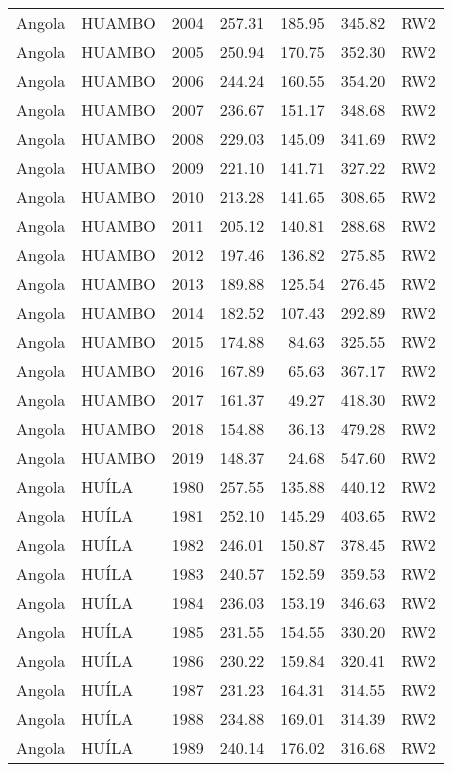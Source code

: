 \begin{longtable}{lllrrrl}
  Angola & HUAMBO & 2004 & 257.31 & 185.95 & 345.82 & RW2 \\ 
  Angola & HUAMBO & 2005 & 250.94 & 170.75 & 352.30 & RW2 \\ 
  Angola & HUAMBO & 2006 & 244.24 & 160.55 & 354.20 & RW2 \\ 
  Angola & HUAMBO & 2007 & 236.67 & 151.17 & 348.68 & RW2 \\ 
  Angola & HUAMBO & 2008 & 229.03 & 145.09 & 341.69 & RW2 \\ 
  Angola & HUAMBO & 2009 & 221.10 & 141.71 & 327.22 & RW2 \\ 
  Angola & HUAMBO & 2010 & 213.28 & 141.65 & 308.65 & RW2 \\ 
  Angola & HUAMBO & 2011 & 205.12 & 140.81 & 288.68 & RW2 \\ 
  Angola & HUAMBO & 2012 & 197.46 & 136.82 & 275.85 & RW2 \\ 
  Angola & HUAMBO & 2013 & 189.88 & 125.54 & 276.45 & RW2 \\ 
  Angola & HUAMBO & 2014 & 182.52 & 107.43 & 292.89 & RW2 \\ 
  Angola & HUAMBO & 2015 & 174.88 & 84.63 & 325.55 & RW2 \\ 
  Angola & HUAMBO & 2016 & 167.89 & 65.63 & 367.17 & RW2 \\ 
  Angola & HUAMBO & 2017 & 161.37 & 49.27 & 418.30 & RW2 \\ 
  Angola & HUAMBO & 2018 & 154.88 & 36.13 & 479.28 & RW2 \\ 
  Angola & HUAMBO & 2019 & 148.37 & 24.68 & 547.60 & RW2 \\ 
  Angola & HUÍLA & 1980 & 257.55 & 135.88 & 440.12 & RW2 \\ 
  Angola & HUÍLA & 1981 & 252.10 & 145.29 & 403.65 & RW2 \\ 
  Angola & HUÍLA & 1982 & 246.01 & 150.87 & 378.45 & RW2 \\ 
  Angola & HUÍLA & 1983 & 240.57 & 152.59 & 359.53 & RW2 \\ 
  Angola & HUÍLA & 1984 & 236.03 & 153.19 & 346.63 & RW2 \\ 
  Angola & HUÍLA & 1985 & 231.55 & 154.55 & 330.20 & RW2 \\ 
  Angola & HUÍLA & 1986 & 230.22 & 159.84 & 320.41 & RW2 \\ 
  Angola & HUÍLA & 1987 & 231.23 & 164.31 & 314.55 & RW2 \\ 
  Angola & HUÍLA & 1988 & 234.88 & 169.01 & 314.39 & RW2 \\ 
  Angola & HUÍLA & 1989 & 240.14 & 176.02 & 316.68 & RW2 \\ 

\end{longtable}

